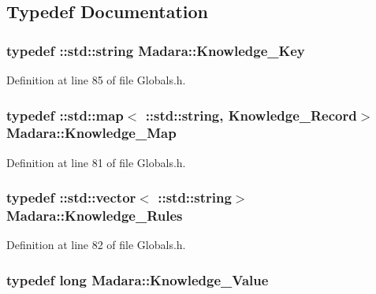 \subsection{Typedef Documentation}
\hypertarget{namespaceMadara_a9e2183de30b1e287a420204e355007d6}{
\subsubsection[{Knowledge\_\-Key}]{\setlength{\rightskip}{0pt plus 5cm}typedef ::std::string {\bf Madara::Knowledge\_\-Key}}}
\label{d8/da1/namespaceMadara_a9e2183de30b1e287a420204e355007d6}


Definition at line 85 of file Globals.h.

\hypertarget{namespaceMadara_a072a1733d5e97cad8e1564c37135a506}{
\subsubsection[{Knowledge\_\-Map}]{\setlength{\rightskip}{0pt plus 5cm}typedef ::std::map$<$ ::std::string, {\bf Knowledge\_\-Record}$>$ {\bf Madara::Knowledge\_\-Map}}}
\label{d8/da1/namespaceMadara_a072a1733d5e97cad8e1564c37135a506}


Definition at line 81 of file Globals.h.

\hypertarget{namespaceMadara_a40d054dded9fdde46b83532c44c6ff96}{
\subsubsection[{Knowledge\_\-Rules}]{\setlength{\rightskip}{0pt plus 5cm}typedef ::std::vector$<$ ::std::string$>$ {\bf Madara::Knowledge\_\-Rules}}}
\label{d8/da1/namespaceMadara_a40d054dded9fdde46b83532c44c6ff96}


Definition at line 82 of file Globals.h.

\hypertarget{namespaceMadara_a56e2f4a683b068af25c2ffb47d9a825e}{
\subsubsection[{Knowledge\_\-Value}]{\setlength{\rightskip}{0pt plus 5cm}typedef long {\bf Madara::Knowledge\_\-Value}}}
\label{d8/da1/namespaceMadara_a56e2f4a683b068af25c2ffb47d9a825e}


